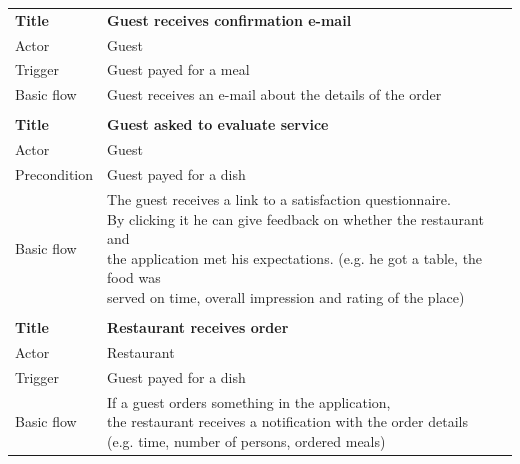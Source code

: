 \begin{table}[ht]
\begin{tabular}{ | l | l |}
		\hline
		& \\
		\hline
		\textbf{Title} & \textbf{Guest receives confirmation e-mail} \\ \hline
		Actor &  Guest \\ \hline
		Trigger &  Guest payed for a meal \\ \hline
		Basic flow & Guest receives an e-mail about the details of the order \\ 
		\hline		
		& \\
		\hline
		\textbf{Title} & \textbf{Guest asked to evaluate service} \\ \hline
		Actor &  Guest \\ \hline
		Precondition &  Guest payed for a dish \\ \hline
		Basic flow & \makecell[l]{ The guest receives a link to a satisfaction questionnaire. \\ By clicking it he can give feedback on whether the restaurant and \\ the application met his expectations. (e.g. he got a table, the food was \\ served on time, overall impression and rating of the place) } \\ 
		\hline	
		& \\	
		\hline
		\textbf{Title} & \textbf{Restaurant receives order} \\ \hline
		Actor &  Restaurant \\ \hline
		Trigger &  Guest payed for a dish \\ \hline
		Basic flow & \makecell[l]{ If a guest orders something in the application, \\ the restaurant receives a notification with the order details \\ (e.g. time, number of persons, ordered meals) } \\ 
		\hline			
	\end{tabular}
\end{table}
